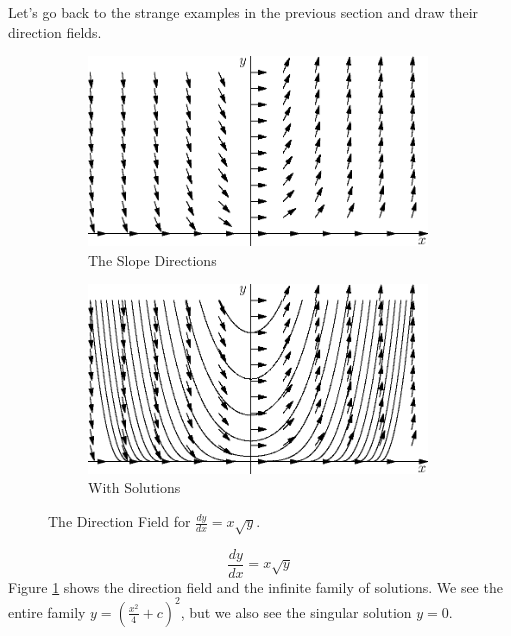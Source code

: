 \documentclass[fleqn,letterpaper]{report}
\begin{document}
Let's go back to the strange examples in the previous section
and draw their direction fields.

\begin{figure}[h!]
\centering
\begin{subfigure}{.5\textwidth}
\centering
\includegraphics[width=9cm]{figure08.eps}
\caption{The Slope Directions}
\end{subfigure}
\begin{subfigure}{.5\textwidth}
\centering
\includegraphics[width=9cm]{figure09.eps}
\caption{With Solutions}
\end{subfigure}
\caption{The Direction Field for $\frac{dy}{dx} = x \sqrt{y}$.}
\label{figure-direction-field2}
\end{figure}

\begin{example}
\begin{equation*}
\frac{dy}{dx} = x \sqrt{y}
\end{equation*}
Figure \ref{figure-direction-field2} shows the direction field
and the infinite family of solutions.  We see the entire
family $y = (\frac{x^2}{4} + c)^2$, but we also see the
singular solution $y=0$. 
\end{example}
\end{document}
